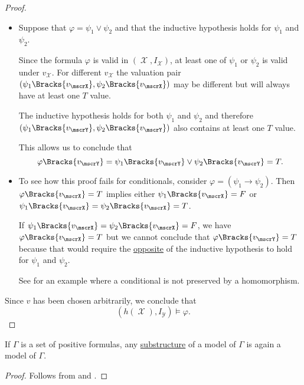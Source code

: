 \begin{proof}
\begin{itemize}
    \item Suppose that \( \varphi = \psi_1 \vee \psi_2 \) and that the inductive hypothesis holds for \( \psi_1 \) and \( \psi_2 \).

    Since the formula \( \varphi \) is valid in \( (\mscrX, I_\mscrX) \), at least one of \( \psi_1 \) or \( \psi_2 \) is valid under \( v_\mscrX \). For different \( v_\mscrX \) the valuation pair \( (\psi_1\Bracks{v_\mscrX}, \psi_2\Bracks{v_\mscrX}) \) may be different but will always have at least one \( T \) value.

    The inductive hypothesis holds for both \( \psi_1 \) and \( \psi_2 \) and therefore \( (\psi_1\Bracks{v_\mscrY}, \psi_2\Bracks{v_\mscrY}) \) also contains at least one \( T \) value.

    This allows us to conclude that
    \begin{equation*}
      \varphi\Bracks{v_\mscrY}
      =
      \psi_1\Bracks{v_\mscrY} \vee \psi_2\Bracks{v_\mscrY}
      =
      T.
    \end{equation*}

    \item To see how this proof fails for conditionals, consider \( \varphi = (\psi_1 \rightarrow \psi_2) \). Then \( \varphi\Bracks{v_\mscrX} = T \) implies either \( \psi_1\Bracks{v_\mscrX} = F \) or \( \psi_1\Bracks{v_\mscrX} = \psi_2\Bracks{v_\mscrX} = T \).

    If \( \psi_1\Bracks{v_\mscrX} = \psi_2\Bracks{v_\mscrX} = F \), we have \( \varphi\Bracks{v_\mscrX} = T \) but we cannot conclude that \( \varphi\Bracks{v_\mscrY} = T \) because that would require the \hyperref[def:material_implication/opposite]{opposite} of the inductive hypothesis to hold for \( \psi_1 \) and \( \psi_2 \).

    See  for an example where a conditional is not preserved by a homomorphism.
  \end{itemize}

  Since \( v \) has been chosen arbitrarily, we conclude that
  \begin{equation*}
    (h(\mscrX), I_\mscrY) \vDash \varphi.
  \end{equation*}
\end{proof}

\begin{corollary}\label{thm:substructure_is_model}
  If \( \Gamma \) is a set of positive formulas, any \hyperref[def:first_order_substructure]{substructure} of a model of \( \Gamma \) is again a model of \( \Gamma \).
\end{corollary}
\begin{proof}
  Follows from  and .
\end{proof}

